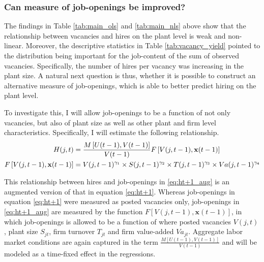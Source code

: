





 
\subsubsection{Can measure of job-openings be improved?}

The findings in Table \ref{tab:main_ols} and \ref{tab:main_nls} above show that the relationship between vacancies and hires on the plant level is weak and non-linear. Moreover, the descriptive statistics in Table \ref{tab:vacancy_yield} pointed to the distribution being important for the job-content of the sum of observed vacancies. Specifically, the number of hires per vacancy was increasing in the plant size. A natural next question is thus, whether it is possible to construct an alternative measure of job-openings, which is able to better predict hiring on the plant level. 

To investigate this, I will allow job-openings to be a function of not only vacancies, but also of plant size as well as other plant and firm level characteristics. Specifically, I will estimate the following relationship. 
\begin{align}
\tiny
H(j,t)&=\frac{M\left[U(t-1), V(t-1)\right]}{V(t-1)} F\left[ V(j,t-1), \mathbf{x}(t-1) \right] 
\label{eq:ht+1_aug} \\
F\left[V(j,t-1),\mathbf{x}(t-1)\right]&=V(j,t-1)^{\gamma_1}  \times  S(j,t-1)^{\gamma_2} \times T(j,t-1)^{\gamma_3} \times  Va(j,t-1)^{\gamma_4} \nonumber
\end{align}

This relationship between hires and job-openings in \eqref{eq:ht+1_aug} is an augmented version of that in equation \eqref{eq:ht+1}. Whereas job-openings in equation \eqref{eq:ht+1} were measured as posted vacancies only, job-openings in \eqref{eq:ht+1_aug} are measured by the function $F\left[ V(j,t-1), \mathbf{x}(t-1) \right]$, in which job-openings is allowed to be a function of where posted vacancies $V(j,t)$, plant size  $S_{jt}$, firm turnover $T_{jt}$ and firm value-added  $Va_{jt}$. Aggregate labor market conditions are again captured in the term $\frac{M\left[U(t-1), V(t-1)\right]}{V(t-1)}$ and will be modeled as a time-fixed effect in the regressions.


